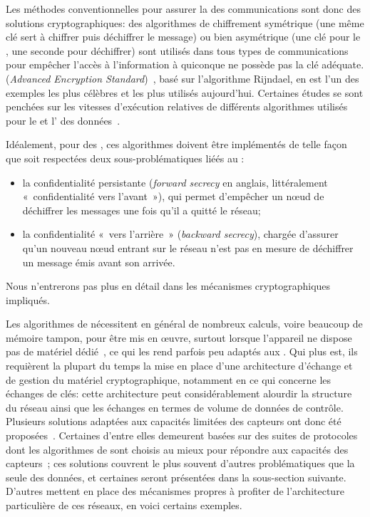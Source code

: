 Les méthodes conventionnelles pour assurer la  des communications sont donc des solutions cryptographiques: des algorithmes de chiffrement symétrique (une même clé sert à chiffrer puis déchiffrer le message) ou bien asymétrique (une clé pour le , une seconde pour déchiffrer) sont utilisés dans tous types de communications pour empêcher l'accès à l'information à quiconque ne possède pas la clé adéquate.
 (\textit{Advanced Encryption Standard})~\cite{aes}, basé sur l'algorithme Rijndael, en est l'un des exemples les plus célèbres et les plus utilisés aujourd'hui.
Certaines études se sont penchées sur les vitesses d'exécution relatives de différents algorithmes utilisés pour le  et l' des données~\cite{SOBMCN11}.

Idéalement, pour des \rcs, ces algorithmes doivent être implémentés de telle façon que soit respectées deux sous-problématiques liéés au :
\begin{itemize}
    \item la confidentialité persistante (\textit{forward secrecy} en anglais, littéralement « confidentialité vers l'avant »), qui permet d'empêcher un nœud de déchiffrer les messages une fois qu'il a quitté le réseau;
    \item la confidentialité « vers l'arrière » (\textit{backward secrecy}), chargée d'assurer qu'un nouveau nœud entrant sur le réseau n'est pas en mesure de déchiffrer un message émis avant son arrivée.
\end{itemize}
Nous n'entrerons pas plus en détail dans les mécanismes cryptographiques impliqués.

Les algorithmes de  nécessitent en général de nombreux calculs, voire beaucoup de mémoire tampon, pour être mis en œuvre, surtout lorsque l'appareil ne dispose pas de matériel dédié~\cite{PLP06}, ce qui les rend parfois peu adaptés aux \rcs.
Qui plus est, ils requièrent la plupart du temps la mise en place d'une architecture d'échange et de gestion du matériel cryptographique, notamment en ce qui concerne les échanges de clés: cette architecture peut considérablement alourdir la structure du réseau ainsi que les échanges en termes de volume de données de contrôle.
Plusieurs solutions adaptées aux capacités limitées des capteurs ont donc été proposées~\cite{OX09}.
Certaines d'entre elles demeurent basées sur des suites de protocoles dont les algorithmes de  sont choisis au mieux pour répondre aux capacités des capteurs~\cite{SOBMCN11,KR12}; ces solutions couvrent le plus souvent d'autres problématiques que la seule  des données, et certaines seront présentées dans la sous-section suivante.
D'autres mettent en place des mécanismes propres à profiter de l'architecture particulière de ces réseaux, en voici certains exemples.

